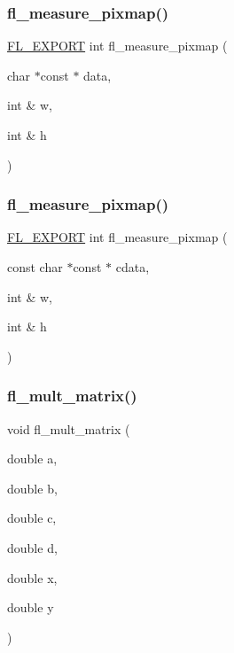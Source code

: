 \subsubsection{\texorpdfstring{fl\+\_\+measure\+\_\+pixmap()}{fl\_measure\_pixmap()}\hspace{0.1cm}{\footnotesize\ttfamily [1/2]}}
{\footnotesize\ttfamily \hyperlink{_fl___export_8_h_aa9ba29a18aee9d738370a06eeb4470fc}{F\+L\+\_\+\+E\+X\+P\+O\+RT} int fl\+\_\+measure\+\_\+pixmap (\begin{DoxyParamCaption}\item[{char $\ast$const $\ast$}]{data,  }\item[{int \&}]{w,  }\item[{int \&}]{h }\end{DoxyParamCaption})}

\mbox{\label{group__fl__drawings_gaedf85a71995496e7cc00b1367d7490b3}} 
\subsubsection{\texorpdfstring{fl\+\_\+measure\+\_\+pixmap()}{fl\_measure\_pixmap()}\hspace{0.1cm}{\footnotesize\ttfamily [2/2]}}
{\footnotesize\ttfamily \hyperlink{_fl___export_8_h_aa9ba29a18aee9d738370a06eeb4470fc}{F\+L\+\_\+\+E\+X\+P\+O\+RT} int fl\+\_\+measure\+\_\+pixmap (\begin{DoxyParamCaption}\item[{const char $\ast$const $\ast$}]{cdata,  }\item[{int \&}]{w,  }\item[{int \&}]{h }\end{DoxyParamCaption})}

\mbox{\label{group__fl__drawings_gab9c6ee4a256e888f7a8af0365f40b515}} 
\subsubsection{\texorpdfstring{fl\+\_\+mult\+\_\+matrix()}{fl\_mult\_matrix()}}
{\footnotesize\ttfamily void fl\+\_\+mult\+\_\+matrix (\begin{DoxyParamCaption}\item[{double}]{a,  }\item[{double}]{b,  }\item[{double}]{c,  }\item[{double}]{d,  }\item[{double}]{x,  }\item[{double}]{y }\end{DoxyParamCaption})\hspace{0.3cm}{\ttfamily [inline]}}

